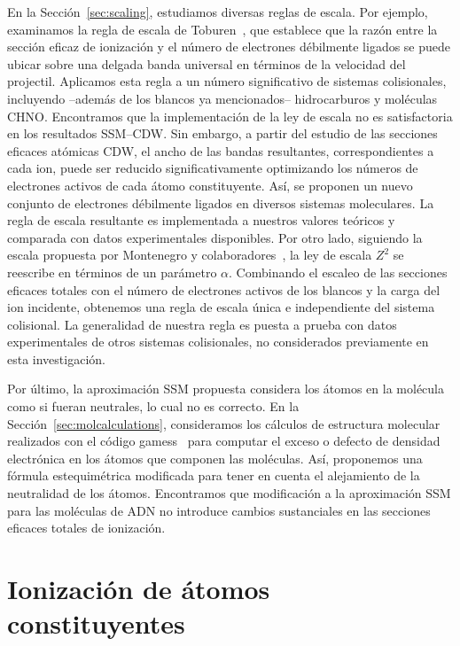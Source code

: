 En la Sección~\ref{sec:scaling}, estudiamos diversas reglas de escala. 
Por ejemplo, examinamos la regla de escala de Toburen~\cite{Toburen:75,
Toburen:76}, que establece que la razón entre la sección eficaz de 
ionización y el número de electrones débilmente ligados se puede ubicar 
sobre una delgada banda universal en términos de la velocidad del 
projectil. Aplicamos esta regla a un número significativo de sistemas 
colisionales, incluyendo --además de los blancos ya mencionados-- 
hidrocarburos y moléculas CHNO. Encontramos que la implementación de la 
ley de escala no es satisfactoria en los resultados SSM--CDW. Sin 
embargo, a partir del estudio de las secciones eficaces atómicas CDW, el 
ancho de las bandas resultantes, correspondientes a cada ion, puede ser 
reducido significativamente optimizando los números de electrones activos 
de cada átomo constituyente. Así, se proponen un nuevo conjunto de 
electrones débilmente ligados en diversos sistemas moleculares. La regla 
de escala resultante es implementada a nuestros valores teóricos y 
comparada con datos experimentales disponibles. Por otro lado, siguiendo 
la escala propuesta por Montenegro y colaboradores~\cite{Dubois:13,
Montenegro:13}, la ley de escala $Z^2$ se reescribe en términos de un 
parámetro $\alpha$. Combinando el escaleo de las secciones eficaces 
totales con el número de electrones activos de los blancos y la carga del 
ion incidente, obtenemos una regla de escala única e independiente del 
sistema colisional. La generalidad de nuestra regla es puesta a prueba 
con datos experimentales de otros sistemas colisionales, no considerados 
previamente en esta investigación.

Por último, la aproximación SSM propuesta considera los átomos en la 
molécula como si fueran neutrales, lo cual no es correcto. En la 
Sección~\ref{sec:molcalculations}, consideramos los cálculos de 
estructura molecular realizados con el código {\sc gamess}~\cite{gamess} 
para computar el exceso o defecto de densidad electrónica en los átomos 
que componen las moléculas. Así, proponemos una fórmula estequimétrica 
modificada para tener en cuenta el alejamiento de la neutralidad de los 
átomos. Encontramos que modificación a la aproximación SSM para las 
moléculas de ADN no introduce cambios sustanciales en las secciones 
eficaces totales de ionización.

\section{Ionización de átomos constituyentes}
\label{sec:atoms}

